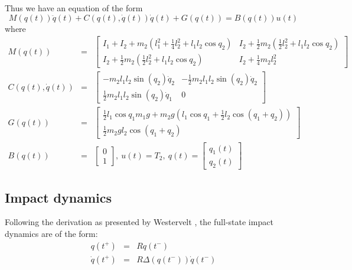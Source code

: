 Thus we have an equation of the form
\begin{equation}
	M\left(q(t)\right)\ddot{q}(t) + C\left(q(t),\dot{q}(t)\right)\dot{q}(t)
	 + G\left(q(t)\right) = B\left(q(t)\right)u(t)
\end{equation} where
\begin{eqnarray*}
	M\left(q(t)\right) &=& \begin{bmatrix}
		I_1 + I_2 + m_2\left(l_1^2 + \frac{1}{4}l_2^2 + l_1l_2\cos{q_2}\right) &
		I_2 + \frac{1}{2}m_2\left(\frac{1}{2}l_2^2 + l_1l_2\cos{q_2}\right) \\
		I_2 + \frac{1}{2}m_2\left(\frac{1}{2}l_2^2 + l_1l_2\cos{q_2}\right) &
		I_2 + \frac{1}{4}m_2l_2^2
	\end{bmatrix} \\
	C\left(q(t),\dot{q}(t)\right) &=& \begin{bmatrix}
		-m_2 l_1 l_2 \sin({q_2}) \dot{q}_2 &
		-\frac{1}{2}m_2 l_1 l_2 \sin({q_2}) \dot{q}_2 \\
		\frac{1}{2}m_2 l_1 l_2 \sin({q_2}) \dot{q}_1 & 0
	\end{bmatrix} \\
	G\left(q(t)\right) &=& \begin{bmatrix}
		\frac{1}{2}l_1 \cos{q_1} m_1 g + m_2 g \left(l_1 \cos{q_1} + \frac{1}{2}l_2 \cos{(q_1 + q_2)} \right) \\
		\frac{1}{2} m_2 g l_2 \cos{(q_1 + q_2)}
	\end{bmatrix} \\
	B\left(q(t)\right) &=& \begin{bmatrix}
		0 \\ 1
	\end{bmatrix}, ~
	u(t) = T_2, ~
	q(t) = \begin{bmatrix}
		q_1(t) \\ q_2(t)
	\end{bmatrix}
\end{eqnarray*}

\subsection{Impact dynamics}
Following the derivation as presented by Westervelt \cite{westervelt2007feedback}, the full-state impact dynamics are of the form: \\
\begin{eqnarray}
	q\left(t^+\right) &=& Rq\left(t^-\right) \\
	\dot{q}\left(t^+\right) &=& R\Delta\left(q\left(t^-\right)\right)\dot{q}\left(t^-\right)
\end{eqnarray}

